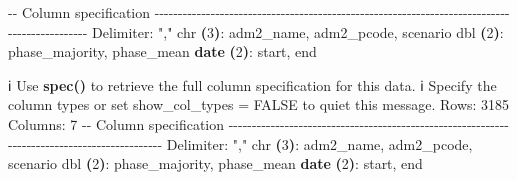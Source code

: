 \documentclass[
  a4paper,
]{article}
\newenvironment{Shaded}{\begin{snugshade}}{\end{snugshade}}
\newcommand{\AttributeTok}[1]{\textcolor[rgb]{0.13,0.29,0.53}{#1}}
\newcommand{\BuiltInTok}[1]{#1}
\newcommand{\ErrorTok}[1]{\textcolor[rgb]{0.64,0.00,0.00}{\textbf{#1}}}
\newcommand{\ExtensionTok}[1]{#1}
\newcommand{\FunctionTok}[1]{\textcolor[rgb]{0.13,0.29,0.53}{\textbf{#1}}}
\newcommand{\KeywordTok}[1]{\textcolor[rgb]{0.13,0.29,0.53}{\textbf{#1}}}
\newcommand{\NormalTok}[1]{#1}
\newcommand{\StringTok}[1]{\textcolor[rgb]{0.31,0.60,0.02}{#1}}
\begin{document}
\begin{Shaded}
\begin{Highlighting}[]
\ExtensionTok{{-}{-}}\NormalTok{ Column specification }\AttributeTok{{-}{-}{-}{-}{-}{-}{-}{-}{-}{-}{-}{-}{-}{-}{-}{-}{-}{-}{-}{-}{-}{-}{-}{-}{-}{-}{-}{-}{-}{-}{-}{-}{-}{-}{-}{-}{-}{-}{-}{-}{-}{-}{-}{-}{-}{-}{-}{-}{-}{-}{-}{-}{-}{-}{-}{-}{-}{-}{-}{-}{-}{-}{-}{-}{-}{-}{-}{-}{-}{-}{-}{-}{-}{-}{-}{-}{-}{-}{-}{-}{-}{-}{-}{-}{-}{-}{-}{-}{-}{-}{-}{-}{-}}
\ExtensionTok{Delimiter:} \StringTok{","}
\ExtensionTok{chr}  \ErrorTok{(}\ExtensionTok{3}\KeywordTok{)}\BuiltInTok{:}\NormalTok{ adm2\_name, adm2\_pcode, scenario}
\ExtensionTok{dbl}  \ErrorTok{(}\ExtensionTok{2}\KeywordTok{)}\BuiltInTok{:}\NormalTok{ phase\_majority, phase\_mean}
\FunctionTok{date} \ErrorTok{(}\ExtensionTok{2}\KeywordTok{)}\BuiltInTok{:}\NormalTok{ start, end}

\ExtensionTok{ℹ}\NormalTok{ Use }\KeywordTok{\textasciigrave{}}\FunctionTok{spec()}\KeywordTok{\textasciigrave{}}\NormalTok{ to retrieve the full column specification for this data.}
\ExtensionTok{ℹ}\NormalTok{ Specify the column types or set }\KeywordTok{\textasciigrave{}}\ExtensionTok{show\_col\_types}\NormalTok{ = FALSE}\KeywordTok{\textasciigrave{}}\NormalTok{ to quiet this message.}
\ExtensionTok{Rows:}\NormalTok{ 3185 Columns: 7                                                                                                }
\ExtensionTok{{-}{-}}\NormalTok{ Column specification }\AttributeTok{{-}{-}{-}{-}{-}{-}{-}{-}{-}{-}{-}{-}{-}{-}{-}{-}{-}{-}{-}{-}{-}{-}{-}{-}{-}{-}{-}{-}{-}{-}{-}{-}{-}{-}{-}{-}{-}{-}{-}{-}{-}{-}{-}{-}{-}{-}{-}{-}{-}{-}{-}{-}{-}{-}{-}{-}{-}{-}{-}{-}{-}{-}{-}{-}{-}{-}{-}{-}{-}{-}{-}{-}{-}{-}{-}{-}{-}{-}{-}{-}{-}{-}{-}{-}{-}{-}{-}{-}{-}{-}{-}{-}{-}}
\ExtensionTok{Delimiter:} \StringTok{","}
\ExtensionTok{chr}  \ErrorTok{(}\ExtensionTok{3}\KeywordTok{)}\BuiltInTok{:}\NormalTok{ adm2\_name, adm2\_pcode, scenario}
\ExtensionTok{dbl}  \ErrorTok{(}\ExtensionTok{2}\KeywordTok{)}\BuiltInTok{:}\NormalTok{ phase\_majority, phase\_mean}
\FunctionTok{date} \ErrorTok{(}\ExtensionTok{2}\KeywordTok{)}\BuiltInTok{:}\NormalTok{ start, end}


\end{Highlighting}
\end{Shaded}
\end{document}
